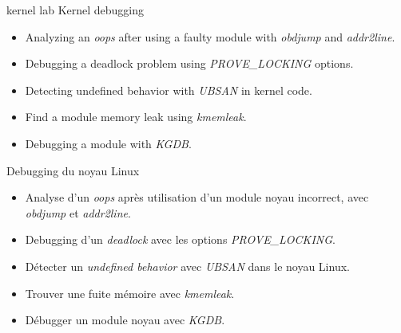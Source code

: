 {kernel}
{lab}
{Kernel debugging}
{
  \begin{itemize}
  \item Analyzing an {\em oops} after using a faulty module with
    {\em obdjump} and {\em addr2line}.
  \item Debugging a deadlock problem using {\em PROVE\_LOCKING} options.
  \item Detecting undefined behavior with {\em UBSAN} in kernel code.
  \item Find a module memory leak using {\em kmemleak}.
  \item Debugging a module with {\em KGDB}.
  \end{itemize}
}
{Debugging du noyau Linux}
{
  \begin{itemize}
  \item Analyse d'un {\em oops} après utilisation d'un module noyau
    incorrect, avec {\em obdjump} et {\em addr2line}.
  \item Debugging d'un {\em deadlock} avec les options {\em PROVE\_LOCKING}.
  \item Détecter un {\em undefined behavior} avec {\em UBSAN} dans le noyau Linux.
  \item Trouver une fuite mémoire avec {\em kmemleak}.
  \item Débugger un module noyau avec {\em KGDB}.
  \end{itemize}
}

\def \feshowboards{
    \ifthenelse{\equal{\agendalanguage}{french}}{
      \section{Plateforme matérielle pour les travaux pratiques}
    }{
      \section{Hardware platform for practical labs}
    }

  \showboarditem{stm32mp1}
  \newpage
}

